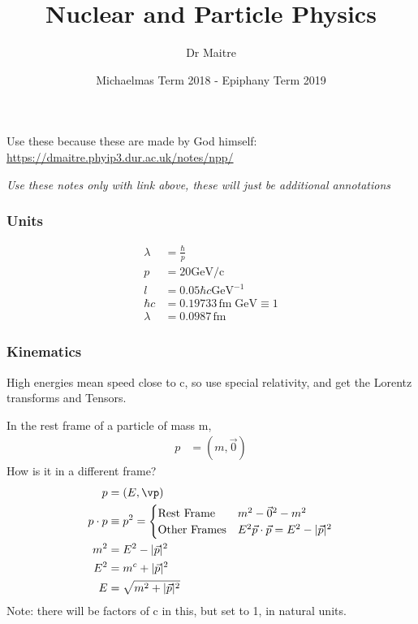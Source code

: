 \documentclass[a4paper, 11pt, normalem]{report}
\title{Nuclear and Particle Physics \vspace{-20pt}}
\author{Dr Maitre}
\date{\vspace{-15pt}Michaelmas Term 2018 - Epiphany Term 2019}
\begin{document}
\maketitle
\tableofcontents

\part{}
\chapter{}

Use these because these are made by God himself:
\url{https://dmaitre.phyip3.dur.ac.uk/notes/npp/}

\emph{Use these notes only with link above, these will just be additional annotations}

\section{Units}

\begin{example}
    \begin{align}
        \lambda &= \frac{\hbar}{p} \\
        p &= 20 \text{GeV/c} \\
        l &= 0.05 \hbar c\text{GeV}^{-1} \\
        \hbar c &= 0.19733 \,\text{fm}\;\text{GeV} \equiv 1 \\
        \lambda &= 0.0987 \,\text{fm}
    \end{align}
\end{example}

\section{Kinematics}

High energies mean speed close to c, so use special relativity, and get the Lorentz transforms and Tensors.

\begin{example}[4-Momenta]
    In the rest frame of a particle of mass m, 
    \begin{align}
        p &= (m, \vec{0})
    \end{align}
    How is it in a different frame?
    \begin{align}
        p &= (E,\vp) \\
        p\cdot p &\equiv p^2 = \begin{cases} \text{Rest Frame} & m^2 - \vec{0}^2 - m^2 \\ \text{Other Frames} & E^2 \vec{p}\cdot\vec{p} = E^2 - |\vec{p}|^2 \end{cases} \\
        m^2 &= E^2 - |\vec{p}|^2 \\
        E^2 &= m^c + |\vec{p}|^2 \\
        E &= \sqrt{m^2 + |\vec{p}|^2}
    \end{align}
    Note: there will be factors of c in this, but set to 1, in natural units.
\end{example}
\end{document}
